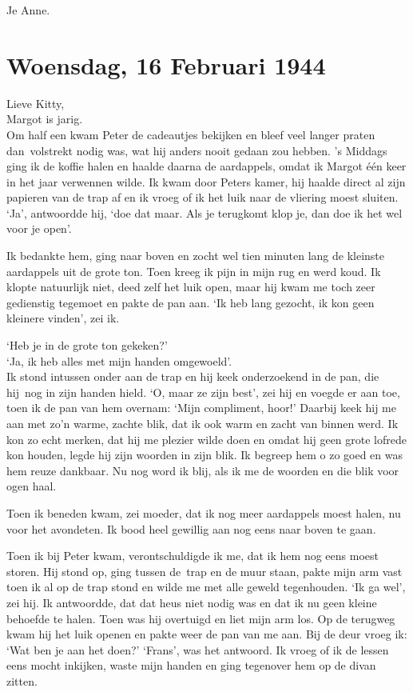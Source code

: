 \documentclass{book}
\begin{document}
Je Anne.

\section*{Woensdag, 16 Februari 1944}

Lieve Kitty,\\
Margot is jarig.\\
Om half een kwam Peter de cadeautjes bekijken
en bleef veel langer praten dan~volstrekt nodig was, wat hij anders nooit gedaan
zou hebben. 's Middags ging ik de koffie halen en haalde daarna de aardappels,
omdat ik Margot één keer in het jaar verwennen wilde. Ik kwam door Peters kamer,
hij haalde direct al zijn papieren van de trap af en ik vroeg of ik het luik
naar de vliering moest sluiten. `Ja', antwoordde hij, `doe dat maar. Als je
terugkomt klop je, dan doe ik het wel voor je open'.

Ik bedankte hem, ging naar boven en zocht wel tien minuten lang de kleinste
aardappels uit de grote ton. Toen kreeg ik pijn in mijn rug en werd koud. Ik
klopte natuurlijk niet, deed zelf het luik open, maar hij kwam me toch zeer
gedienstig tegemoet en pakte de pan aan. `Ik heb lang gezocht, ik kon geen
kleinere vinden', zei ik.

`Heb je in de grote ton gekeken?'\\
`Ja, ik heb alles met mijn handen
omgewoeld'.\\
Ik stond intussen onder aan de trap en hij keek onderzoekend in de
pan, die hij~nog in zijn handen hield. `O, maar ze zijn best', zei hij en voegde
er aan toe, toen ik de pan van hem overnam: `Mijn compliment, hoor!' Daarbij
keek hij me aan met zo'n warme, zachte blik, dat ik ook warm en zacht van binnen
werd. Ik kon zo echt merken, dat hij me plezier wilde doen en omdat hij geen
grote lofrede kon houden, legde hij zijn woorden in zijn blik. Ik begreep hem o
zo goed en was hem reuze dankbaar. Nu nog word ik blij, als ik me de woorden en
die blik voor ogen haal.

Toen ik beneden kwam, zei moeder, dat ik nog meer aardappels moest halen, nu
voor het avondeten. Ik bood heel gewillig aan nog eens naar boven te gaan.

Toen ik bij Peter kwam, verontschuldigde ik me, dat ik hem nog eens moest
storen. Hij stond op, ging tussen de~trap en de muur staan, pakte mijn arm vast
toen ik al op de trap stond en wilde me met alle geweld tegenhouden. `Ik ga
wel', zei hij. Ik antwoordde, dat dat heus niet nodig was en dat ik nu geen
kleine behoefde te halen. Toen was hij overtuigd en liet mijn arm los. Op de
terugweg kwam hij het luik openen en pakte weer de pan van me aan. Bij de deur
vroeg ik: `Wat ben je aan het doen?' `Frans', was het antwoord. Ik vroeg of ik
de lessen eens mocht inkijken, waste mijn handen en ging tegenover hem op de
divan zitten.
\end{document}
